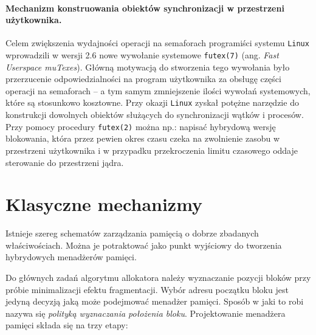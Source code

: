 \documentclass[12pt,a4paper,titlepage,twoside]{mwart}
\begin{document}
\paragraph{Mechanizm konstruowania obiektów synchronizacji w przestrzeni
użytkownika.} Celem zwiększenia wydajności operacji na semaforach programiści
systemu \texttt{Linux} wprowadzili w wersji 2.6 nowe wywołanie systemowe
\verb+futex(7)+ (ang. \textit{Fast Userspace muTexes}). Główną motywacją do
stworzenia tego wywołania było przerzucenie odpowiedzialności na program
użytkownika za obsługę części operacji na semaforach -- a tym samym
zmniejszenie ilości wywołań systemowych, które są stosunkowo kosztowne. Przy
okazji \texttt{Linux} zyskał potężne narzędzie do konstrukcji dowolnych
obiektów służących do synchronizacji wątków i procesów. Przy pomocy procedury
\verb+futex(2)+ można np.: napisać hybrydową wersję blokowania, która przez
pewien okres czasu czeka na zwolnienie zasobu w przestrzeni użytkownika i w
przypadku przekroczenia limitu czasowego oddaje sterowanie do przestrzeni
jądra.

\newpage


\section{Klasyczne mechanizmy}
\hypertarget{Klasyka}{}

Istnieje szereg schematów zarządzania pamięcią o dobrze zbadanych
właściwościach. Można je potraktować jako punkt wyjściowy do tworzenia
hybrydowych menadżerów pamięci.

Do głównych zadań algorytmu allokatora należy wyznaczanie pozycji bloków przy
próbie minimalizacji efektu fragmentacji. Wybór adresu początku bloku jest
jedyną decyzją jaką może podejmować menadżer pamięci. Sposób w jaki to robi
nazywa się \textit{polityką wyznaczania położenia bloku}. Projektowanie
menadżera pamięci składa się na trzy etapy:
\end{document}
